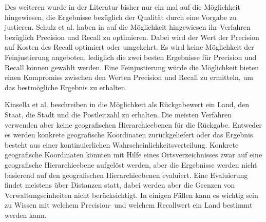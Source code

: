 		Des weiteren wurde in der Literatur bisher nur ein mal auf die Möglichkeit hingewiesen, die Ergebnisse bezüglich der Qualität durch eine Vorgabe zu justieren.  
		Schulz et al. haben in \cite{Schulz2013} auf die Möglichkeit hingewiesen ihr Verfahren bezüglich Precision und Recall zu optimieren.
		Dabei wird der Wert der Precision auf Kosten des Recall optimiert oder umgekehrt.
		Es wird keine Möglichkeit der Feinjustierung angeboten, lediglich die zwei besten Ergebnisse für Precision und Recall können gewählt werden.
		Eine Feinjustierung würde die Möglichkeit bieten einen Kompromiss zwischen den Werten Precision und Recall zu ermitteln, um das bestmögliche Ergebnis zu erhalten.

		Kinsella et al. beschreiben in \cite{Kinsella2011} die Möglichkeit als Rückgabewert ein Land, den Staat, die Stadt und die Postleitzahl zu erhalten.
		Die meisten Verfahren verwenden aber keine geografischen Hierarchieebenen für die Rückgabe. 
		Entweder es werden konkrete geografische Koordinaten zurückgeliefert oder das Ergebnis besteht aus einer kontinuierlichen Wahrscheinlichkeitsverteilung.
		Konkrete geografische Koordinaten könnten mit Hilfe eines Ortsverzeichnisses zwar auf eine geografische Hierarchieebene aufgelöst werden, aber die Ergebnisse werden nicht basierend auf den geografischen Hierarchieebenen evaluiert.
		Eine Evaluierung findet meistens über Distanzen statt, dabei werden aber die Grenzen von Verwaltungseinheiten nicht berücksichtigt. 
		In einigen Fällen kann es wichtig sein zu Wissen mit welchem Precision- und welchem Recallwert ein Land bestimmt werden kann. 

